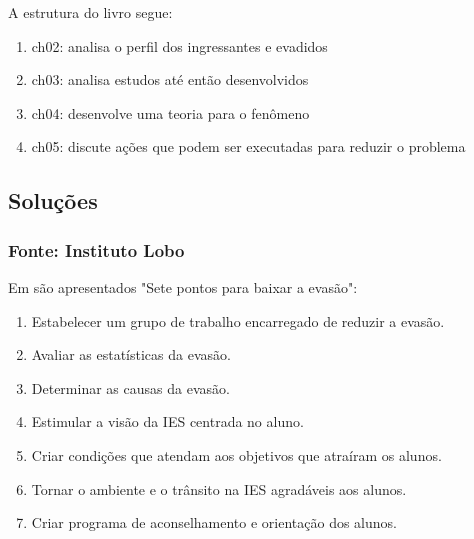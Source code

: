 \documentclass{report}
\begin{document}
A estrutura do livro segue:

\begin{enumerate}

\item ch02: analisa o perfil dos ingressantes e evadidos

\item ch03: analisa estudos até então desenvolvidos
 
\item ch04: desenvolve uma teoria para o fenômeno

\item ch05: discute ações que podem ser executadas para reduzir o problema

\end{enumerate}


\subsection{Soluções}

\subsubsection{Fonte: Instituto Lobo}

Em \cite{evasao_panorama2} são apresentados "Sete pontos para baixar a evasão":

\begin{enumerate}

\item Estabelecer um grupo de trabalho encarregado de reduzir a evasão.

\item Avaliar as estatísticas da evasão.

\item Determinar as causas da evasão.

\item Estimular a visão da IES centrada no aluno.

\item Criar condições que atendam aos objetivos que atraíram os alunos.

\item Tornar o ambiente e o trânsito na IES agradáveis aos alunos.

\item Criar programa de aconselhamento e orientação dos alunos.

\end{enumerate}
\end{document}
